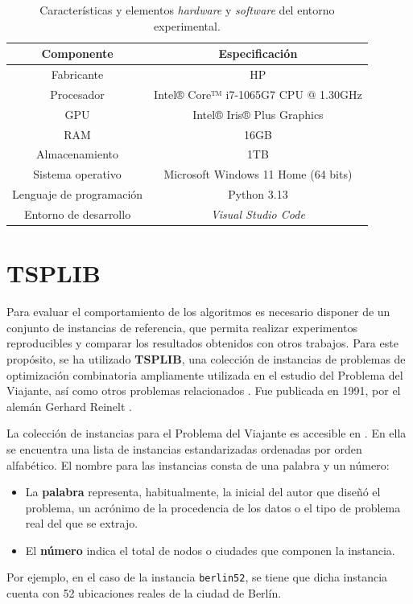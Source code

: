 \begin{table}[ht]
    \renewcommand{\arraystretch}{1.3}
    \caption{Características y elementos \textit{hardware} y \textit{software} del entorno experimental.}
    \label{tab:hw_sw}
    \begin{center}
        \begin{tabular}{|c|c|}
            \hline
            \textbf{Componente} & \textbf{Especificación}\\
            \hline
            Fabricante & HP \\
            \hline
            Procesador & Intel® Core™ i7-1065G7 CPU @ 1.30GHz  \\
            \hline
            GPU  & Intel® Iris® Plus Graphics \\
            \hline
            RAM & 16GB \\
            \hline
            Almacenamiento & 1TB \\
            \hline
            Sistema operativo & Microsoft Windows 11 Home (64 bits)   \\
            \hline
            Lenguaje de programación & Python 3.13 \\
            \hline
            Entorno de desarrollo & \textit{Visual Studio Code} \\
            \hline
        \end{tabular}
    \end{center}
\end{table}

\section{TSPLIB}
\label{sec:tsplib}

Para evaluar el comportamiento de los algoritmos es necesario disponer de un conjunto de instancias de referencia, que permita
realizar experimentos reproducibles y comparar los resultados obtenidos con otros trabajos. Para este propósito, se ha utilizado
\textbf{TSPLIB}, una colección de instancias de problemas de optimización combinatoria ampliamente utilizada en el estudio del 
Problema del Viajante, así como otros problemas relacionados \cite{tsplib}. Fue publicada en 1991, por el alemán Gerhard Reinelt
\cite{reinelt1991} \cite{wikipedia2026}.

La colección de instancias para el Problema del Viajante es accesible en \cite{tsp_dataset}. En ella se encuentra una lista de 
instancias estandarizadas ordenadas por orden alfabético. El nombre para las instancias consta de una palabra y un número:
\begin{itemize}
  \item La \textbf{palabra} representa, habitualmente, la inicial del autor que diseñó el problema, un acrónimo de la 
  procedencia de los datos o el tipo de problema real del que se extrajo.
  \item El \textbf{número} indica el total de nodos o ciudades que componen la instancia.
\end{itemize}
Por ejemplo, en el caso de la instancia \texttt{berlin52}, se tiene que dicha instancia cuenta con 52 ubicaciones reales de la 
ciudad de Berlín.


